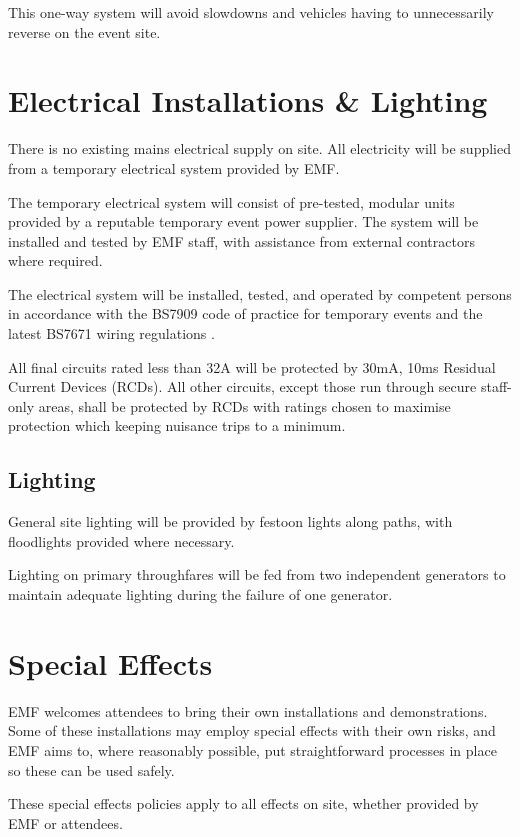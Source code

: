 This one-way system will avoid slowdowns and vehicles having to unnecessarily
reverse on the event site.

\section{Electrical Installations \& Lighting}\label{power}

There is no existing mains electrical supply on site. All electricity will be
supplied from a temporary electrical system provided by EMF.

The temporary electrical system will consist of pre-tested, modular units
provided by a reputable temporary event power supplier. The system will be
installed and tested by EMF staff, with assistance from external contractors
where required.

The electrical system will be installed, tested, and operated by competent
persons in accordance with the BS7909 code of practice for temporary events
\cite{bs7909} and the latest BS7671 wiring regulations \cite{bs7671}.

All final circuits rated less than 32A will be protected by 30mA, 10ms Residual
Current Devices (RCDs).  All other circuits, except those run through secure
staff-only areas, shall be protected by RCDs with ratings chosen to maximise
protection which keeping nuisance trips to a minimum.

\subsection{Lighting}
General site lighting will be provided by festoon lights along paths,
with floodlights provided where necessary.

Lighting on primary throughfares will be fed from two independent generators
to maintain adequate lighting during the failure of one generator.

\newpage

\section{Special Effects}
EMF welcomes attendees to bring their own installations and demonstrations.
Some of these installations may employ special effects with their own risks,
and EMF aims to, where reasonably possible, put straightforward processes in
place so these can be used safely. 

These special effects policies apply to all effects on site, whether provided
by EMF or attendees.


